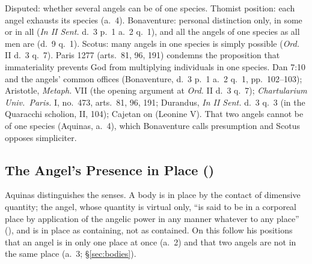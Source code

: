  {Disputed: whether several angels can be of one species. Thomist
  position: each angel exhausts its species (a.~4). Bonaventure: personal
  distinction only, in some or in all (\emph{In II Sent.} d.~3 p.~1 a.~2
  q.~1), and all the angels of one species as all men are (d.~9 q.~1).
  Scotus: many angels in one species is simply possible (\emph{Ord.} II
  d.~3 q.~7). Paris 1277 (arts.~81, 96, 191) condemns the proposition
  that immateriality prevents God from multiplying individuals in one
  species.}
 {Dan 7:10 and the angels' common offices (Bonaventure, d.~3 p.~1 a.~2
  q.~1, pp.~102--103); Aristotle, \emph{Metaph.} VII (the opening
  argument at \emph{Ord.} II d.~3 q.~7); \emph{Chartularium Univ.\
  Paris.} I, no.~473, arts.~81, 96, 191; Durandus, \emph{In II Sent.}
  d.~3 q.~3 (in the Quaracchi scholion, II, 104); Cajetan on \ST{I q.~50
  a.~4} (Leonine V).}
 {That two angels cannot be of one species (Aquinas, a.~4), which
  Bonaventure calls presumption and Scotus opposes simpliciter.}

\subsection{The Angel's Presence in Place ()}\label{sec:dq-place}

Aquinas distinguishes the senses. A body is in place by the contact of
dimensive quantity; the angel, whose quantity is virtual only, ``is said
to be in a corporeal place by application of the angelic power in any
manner whatever to any place'' (\ST{I q.~52 a.~1}), and is in place as
containing, not as contained. On this follow his positions that an angel
is in only one place at once (a.~2) and that two angels are not in the
same place (a.~3; \S\ref{sec:bodies}).

